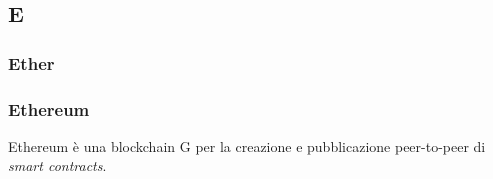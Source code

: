 \subsection*{\textbf{\hfill \Huge{E} \hfill}} 
\subsubsection*{Ether}

\subsubsection*{Ethereum}
Ethereum è una blockchain G per la creazione e pubblicazione peer-to-peer di  \textit{smart contracts}\glos .
